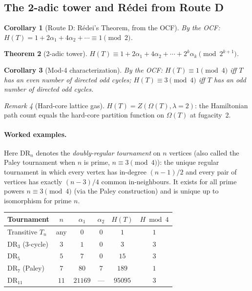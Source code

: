 \documentclass[12pt,reqno]{amsart}
\theoremstyle{plain}
\newtheorem{theorem}{Theorem}[section]
\newtheorem{corollary}[theorem]{Corollary}
\theoremstyle{definition}
\theoremstyle{remark}
\newtheorem{remark}[theorem]{Remark}
\newcommand{\routeD}{\textcolor{axisteal!80!black}{\textbf{Route~D}}}
\renewcommand{\routeD}{Route D}%
\begin{document}
\subsection{The 2-adic tower and Rédei from Route D}

\begin{corollary}[\routeD: Rédei's Theorem, from the OCF]\label{cor:redei_D}
By the OCF: $H(T) = 1 + 2\alpha_1 + 4\alpha_2 + \cdots \equiv 1\pmod{2}$.
\end{corollary}

\begin{theorem}[2-adic tower]\label{thm:2adic}
$H(T)\equiv 1+2\alpha_1+4\alpha_2+\cdots+2^k\alpha_k\pmod{2^{k+1}}$.
\end{theorem}

\begin{corollary}[Mod-4 characterization]\label{cor:mod4}
By the OCF:
$H(T)\equiv 1\pmod{4}$ iff $T$ has an even number of directed odd cycles;
$H(T)\equiv 3\pmod{4}$ iff $T$ has an odd number of directed odd cycles.
\end{corollary}

\begin{remark}[Hard-core lattice gas]
$H(T) = Z(\Omega(T), \lambda=2)$: the Hamiltonian path count equals the
hard-core partition function on $\Omega(T)$ at fugacity~2.
\end{remark}

\paragraph{Worked examples.}
Here $\mathrm{DR}_n$ denotes the \emph{doubly-regular tournament} on $n$ vertices
(also called the Paley tournament when $n$ is prime, $n \equiv 3\pmod4$):
the unique regular tournament in which every vertex has in-degree
$(n-1)/2$ and every pair of vertices has exactly $(n-3)/4$ common in-neighbours.
It exists for all prime powers $n\equiv3\pmod4$ (via the Paley construction)
and is unique up to isomorphism for prime $n$.
\begin{center}
\small\renewcommand{\arraystretch}{1.14}
\begin{tabular}{lccccc}
\toprule
Tournament & $n$ & $\alpha_1$ & $\alpha_2$ & $H(T)$ & $H\bmod4$\\
\midrule
Transitive $T_n$ & any & $0$ & $0$ & $1$ & $1$\\
$\mathrm{DR}_3$ (3-cycle) & $3$ & $1$ & $0$ & $3$ & $3$\\
$\mathrm{DR}_5$ & $5$ & $7$ & $0$ & $15$ & $3$\\
$\mathrm{DR}_7$ (Paley) & $7$ & $80$ & $7$ & $189$ & $1$\\
$\mathrm{DR}_{11}$ & $11$ & $21169$ & --- & $95095$ & $3$\\
\bottomrule
\end{tabular}
\end{center}
\end{document}
